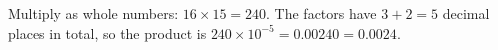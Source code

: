 Multiply as whole numbers: $16\times15=240$. The factors have $3+2=5$ decimal places in total, so the product is $240\times10^{-5}=0.00240=\boxed{0.0024}$.
